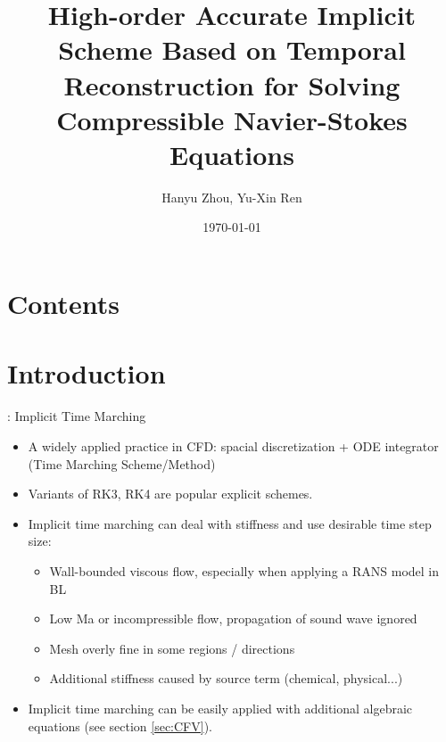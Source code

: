 \documentclass[aspectratio=169,serif]{beamer} %
\title[DITR]{High-order Accurate Implicit Scheme Based on 
Temporal Reconstruction for Solving Compressible 
Navier-Stokes Equations}
\author[Hanyu Zhou, Yu-Xin Ren]{Hanyu Zhou, Yu-Xin Ren}
\institute[Tsinghua University]{\small  Tsinghhua University}
\date{\small \vskip -10pt \today}
\begin{document}


\begin{frame}
  \maketitle
\end{frame}

\section*{Contents}
\frame{
  \frametitle{\secname}
  \tableofcontents[hideallsubsections]
}

\section{Introduction}


\begin{frame}{\secname: Implicit Time Marching}
  \begin{itemize}
    \item  A widely applied practice in CFD:
          spacial discretization + ODE integrator
          (Time Marching Scheme/Method)
    \item Variants of RK3, RK4 are popular
          explicit schemes.
    \item Implicit time marching can deal with stiffness and
          use desirable time step size:
          \begin{itemize}
            \item Wall-bounded viscous flow, especially when applying a RANS model in BL
            \item Low Ma or incompressible flow, propagation of sound wave ignored
            \item Mesh overly fine in some regions / directions
            \item Additional stiffness caused by source term
                  (chemical, physical...)
          \end{itemize}
    \item Implicit time marching can be easily applied with additional algebraic
          equations (see section \ref{sec:CFV}).
  \end{itemize}
\end{frame}
\end{document}
